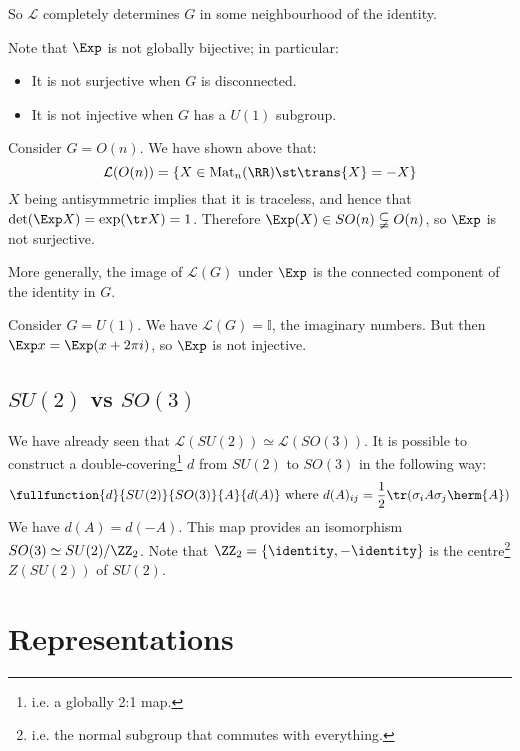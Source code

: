 \documentclass{jknotes}
\begin{document}
So \(\mathcal{L}\) completely determines \(G\) in some neighbourhood of the identity. 

Note that \(\Exp\) is not globally bijective; in particular:
\begin{itemize}
    \item It is not surjective when \(G\) is disconnected.
    \item It is not injective when \(G\) has a \(U(1)\) subgroup.
\end{itemize}

\begin{eg}
    Consider \(G=O(n)\). We have shown above that:
    \begin{equation}
        \mathcal{L}(O(n))=\{X\in\operatorname{Mat}_n(\RR)\st\trans{X}=-X\}
    \end{equation}
    \(X\) being antisymmetric implies that it is traceless, and hence that \(\det(\Exp X)=\exp(\tr X) = 1\). Therefore \(\Exp(X) \in SO(n)\subsetneqq O(n)\), so \(\Exp\) is not surjective.
\end{eg}
More generally, the image of \(\mathcal{L}(G)\) under \(\Exp\) is the connected component of the identity in \(G\).
\begin{eg}
    Consider \(G=U(1)\). We have \(\mathcal{L}(G) = \mathbb{I}\), the imaginary numbers. But then \(\Exp x = \Exp(x+2\pi i)\), so \(\Exp\) is not injective.
\end{eg}

\subsection{\texorpdfstring{$SU(2)$}{SU(2)} vs \texorpdfstring{$SO(3)$}{SO(3)}}
We have already seen that \(\mathcal{L}(SU(2)) \simeq \mathcal{L}(SO(3))\). It is possible to construct a double-covering\footnote{i.e. a globally 2:1 map.} \(d\) from \(SU(2)\) to \(SO(3)\) in the following way:
\begin{equation}
    \fullfunction{d}{SU(2)}{SO(3)}{A}{d(A)} \text{ where } d(A)_{ij} = \frac{1}{2}\tr(\sigma_i A \sigma_j \herm{A})
\end{equation}
We have \(d(A) = d(-A)\). This map provides an isomorphism \(SO(3) \simeq SU(2)/\ZZ_2\). Note that \(\ZZ_2 = \{\identity, -\identity\}\) is the centre\footnote{i.e. the normal subgroup that commutes with everything.} \(Z(SU(2))\) of \(SU(2)\).

\section{Representations}
\end{document}
